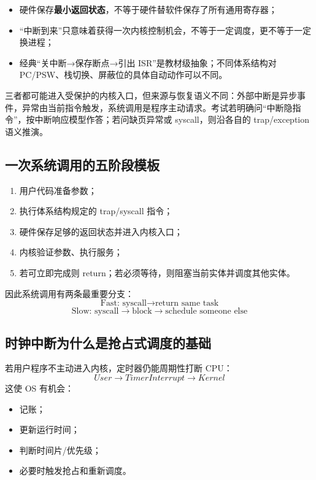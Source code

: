 \documentclass[11pt,a4paper]{ctexart}
\newcommand{\kw}[1]{\textbf{#1}}
\begin{document}
\begin{exam}[边界辨析]
\begin{itemize}
\item 硬件保存\kw{最小返回状态}，不等于硬件替软件保存了所有通用寄存器；
\item “中断到来”只意味着获得一次内核控制机会，不等于一定调度，更不等于一定换进程；
\item 经典“关中断→保存断点→引出 ISR”是教材级抽象；不同体系结构对 PC/PSW、栈切换、屏蔽位的具体自动动作可以不同。
\end{itemize}
\end{exam}

\begin{warn}[中断、异常与系统调用不要机械套同一条微观顺序]
三者都可能进入受保护的内核入口，但来源与恢复语义不同：外部中断是异步事件，异常由当前指令触发，系统调用是程序主动请求。考试若明确问“中断隐指令”，按中断响应模型作答；若问缺页异常或 syscall，则沿各自的 trap/exception 语义推演。
\end{warn}

\subsection{一次系统调用的五阶段模板}

\begin{enumerate}
\item 用户代码准备参数；
\item 执行体系结构规定的 trap/syscall 指令；
\item 硬件保存足够的返回状态并进入内核入口；
\item 内核验证参数、执行服务；
\item 若可立即完成则 return；若必须等待，则阻塞当前实体并调度其他实体。
\end{enumerate}

因此系统调用有两条最重要分支：
\[
\boxed{\text{Fast: syscall}\rightarrow\text{return same task}}
\]
\[
\boxed{\text{Slow: syscall}\rightarrow\text{block}\rightarrow\text{schedule someone else}}
\]

\subsection{时钟中断为什么是抢占式调度的基础}

若用户程序不主动进入内核，定时器仍能周期性打断 CPU：
\[
User\rightarrow TimerInterrupt\rightarrow Kernel
\]
这使 OS 有机会：
\begin{itemize}
\item 记账；
\item 更新运行时间；
\item 判断时间片/优先级；
\item 必要时触发抢占和重新调度。
\end{itemize}
\end{document}
